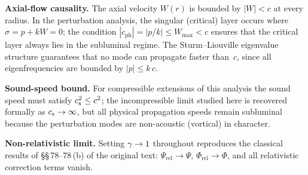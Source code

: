 \begin{causalitycheck}
\textbf{Axial-flow causality.}
The axial velocity $W(r)$ is bounded by $|W|<c$ at every radius.
In the perturbation analysis, the singular (critical) layer occurs
where $\sigma = p+kW = 0$; the condition
$|c_{\mathrm{ph}}|=|p/k|\le W_{\max}<c$ ensures that the critical
layer always lies in the subluminal regime.  The Sturm--Liouville
eigenvalue structure guarantees that no mode can propagate faster
than~$c$, since all eigenfrequencies are bounded by $|p|\le k\,c$.

\textbf{Sound-speed bound.}
For compressible extensions of this analysis the sound speed must
satisfy $c_{\mathrm{s}}^{2}\le c^{2}$; the incompressible limit studied here
is recovered formally as $c_{\mathrm{s}}\to\infty$, but all physical propagation
speeds remain subluminal because the perturbation modes are
non-acoustic (vortical) in character.
\end{causalitycheck}

\bigskip
\noindent\textbf{Non-relativistic limit.}\;
Setting $\gamma\to 1$ throughout reproduces the classical results of
\S\S\,78--78\,(b) of the original text: $\Psi_{\mathrm{rel}}\to\Psi$,
$\Phi_{\mathrm{rel}}\to\Phi$, and all relativistic correction terms
vanish.

